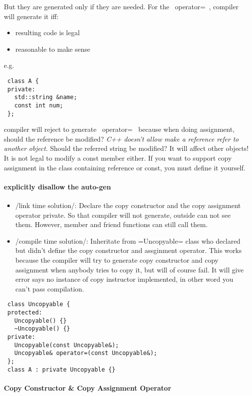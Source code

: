 But they are generated only if they are needed.
For the ~operator=~, compiler will generate it iff:
\begin{itemize}
\item resulting code is legal
\item reasonable to make sense
\end{itemize} 
 e.g.
\begin{lstlisting}
 class A {
 private:
   std::string &name;
   const int num;
 };
\end{lstlisting}

 compiler will reject to generate ~operator=~ because when doing
 assignment, should the reference be modified?  \textit{C++ doesn't
   allow make a reference refer to another object.} Should the
 referred string be modified? It will affect other objects!  It is not
 legal to modify a const member either.  If you want to support copy
 assignment in the class containing reference or const, you must
 define it yourself.

\paragraph{explicitly disallow the auto-gen}

\begin{itemize}
\item /link time solution/: Declare the copy constructor and the copy
  assignment operator private.  So that compiler will not generate,
  outside can not see them.  However, member and friend functions can
  still call them.
\item /compile time solution/: Inheritate from =Uncopyable= class who
  declared but didn't define the copy constructor and assginment
  operator.  This works because the compiler will try to generate copy
  constructor and copy assignment when anybody tries to copy it, but
  will of course fail.  It will give error says no instance of copy
  instructor implemented, in other word you can't pass compilation.
\end{itemize}

\begin{lstlisting}
 class Uncopyable {
 protected:
   Uncopyable() {}
   ~Uncopyable() {}
 private:
   Uncopyable(const Uncopyable&);
   Uncopyable& operator=(const Uncopyable&);
 };
 class A : private Uncopyable {}
\end{lstlisting}

\paragraph{Copy Constructor \& Copy Assignment Operator}

